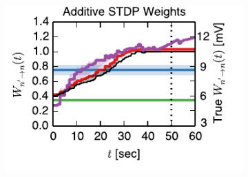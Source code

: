 \begin{figure}[t!]

  \begin{subfigure}[T]{2.4in}
    \flushleft
    \includegraphics[width=\textwidth]{figures/ch4/fig4_add_thr_trajectory_mv}    

\end{subfigure}
\end{figure}
